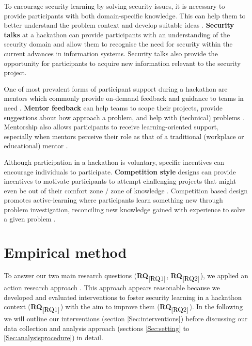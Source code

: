 \documentclass[runningheads]{llncs}
\newcommand{\hr}[1]{\textbf{RQ}$_{\ref{#1}}$}
\begin{document}
To encourage security learning by solving security issues, it is necessary to provide participants with both domain-specific knowledge. This can help them to better understand the problem context and develop suitable ideas \cite{stoyanov2007effect}.
\textbf{Security talks} at a hackathon can provide participants with an understanding of the security domain and allow them to recognise the need for security within the current advances in information systems. Security talks also provide the opportunity for participants to acquire new information \cite{horton2018project} relevant to the security project.

One of most prevalent forms of participant support during a hackathon are mentors which commonly provide on-demand feedback and guidance to teams in need \cite{soltani2014hackathon,byrne2017iot}. \textbf{Mentor feedback} can help teams to scope their projects, provide suggestions about how approach a problem, and help with (technical) problems \cite{lara2016hackathons}. Mentorship also allows participants to receive learning-oriented support, especially when mentors perceive their role as that of a traditional (workplace or educational) mentor \cite{nolte2020support}.

Although participation in a hackathon is voluntary, specific incentives can encourage individuals to participate. \textbf{Competition style} designs can provide incentives to motivate participants to attempt challenging projects that might even be out of their comfort zone / zone of knowledge \cite{grimes2008robotics}. Competition based design promotes active-learning where participants learn something new through problem investigation, reconciling new knowledge gained with experience to solve a given problem \cite{stoyanov2007effect}.

\section{Empirical method}
To answer our two main research questions (\hr{RQ1}, \hr{RQ2}), we applied an action research approach \cite{lewin1946action}. This approach appears reasonable because we developed and evaluated interventions to foster security learning in a hackathon context (\hr{RQ1}) with the aim to improve them (\hr{RQ2}). In the following we will outline our interventions (section \ref{Sec:interventions}) before discussing our data collection and analysis approach (sections \ref{Sec:setting} to \ref{Sec:analysisprocedure}) in detail.
\end{document}
